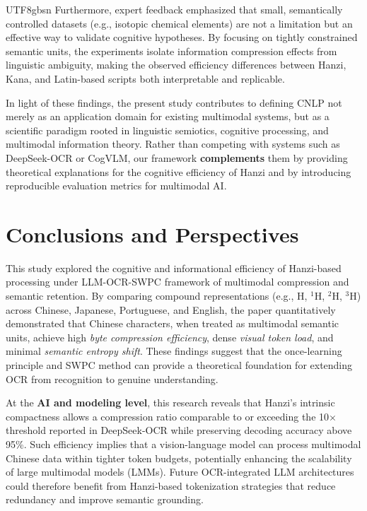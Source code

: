 \documentclass[conference]{IEEEtran}
\begin{document}
\begin{CJK*}{UTF8}{gbsn}
Furthermore, expert feedback emphasized that small, semantically controlled datasets (e.g., isotopic chemical elements) are not a limitation but an effective way to validate cognitive hypotheses. By focusing on tightly constrained semantic units, the experiments isolate information compression effects from linguistic ambiguity, making the observed efficiency differences between Hanzi, Kana, and Latin-based scripts both interpretable and replicable.

In light of these findings, the present study contributes to defining CNLP not merely as an application domain for existing multimodal systems, but as a scientific paradigm rooted in linguistic semiotics, cognitive processing, and multimodal information theory. Rather than competing with systems such as DeepSeek-OCR or CogVLM, our framework \textbf{complements} them by providing theoretical explanations for the cognitive efficiency of Hanzi and by introducing reproducible evaluation metrics for multimodal AI.

\section{Conclusions and Perspectives}
\label{sec:conclusion}

This study explored the cognitive and informational efficiency of Hanzi-based processing under LLM-OCR-SWPC  framework of multimodal compression and semantic retention. By comparing compound representations (e.g., H, $^{1}$H, $^{2}$H, $^{3}$H) across Chinese, Japanese, Portuguese, and English, the paper quantitatively demonstrated that Chinese characters, when treated as multimodal semantic units, achieve high \textit{byte compression efficiency}, dense \textit{visual token load}, and minimal \textit{semantic entropy shift}. These findings suggest that the once-learning principle and SWPC method can provide a theoretical foundation for extending OCR from recognition to genuine understanding.

At the \textbf{AI and modeling level}, this research reveals that Hanzi’s intrinsic compactness allows a compression ratio comparable to or exceeding the 10$\times$ threshold reported in DeepSeek-OCR while preserving decoding accuracy above 95\%. Such efficiency implies that a vision-language model can process multimodal Chinese data within tighter token budgets, potentially enhancing the scalability of large multimodal models (LMMs). Future OCR-integrated LLM architectures could therefore benefit from Hanzi-based tokenization strategies that reduce redundancy and improve semantic grounding.


\end{CJK*}
\end{document}
